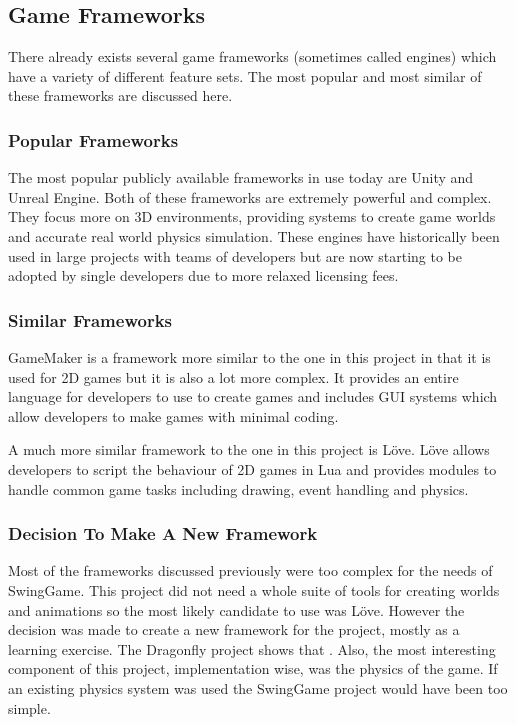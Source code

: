 \documentclass[]{report}
\begin{document}
		\subsection{Game Frameworks}
		There already exists several game frameworks (sometimes called engines) which have a variety of different feature sets. The most popular and most similar of these frameworks are discussed here.
			\subsubsection{Popular Frameworks}
			The most popular publicly available frameworks in use today are Unity\cite{unity} and Unreal Engine\cite{unreal}. Both of these frameworks are extremely powerful and complex. They focus more on 3D environments, providing systems to create game worlds and accurate real world physics simulation. These engines have historically been used in large projects with teams of developers but are now starting to be adopted by single developers due to more relaxed licensing fees.
			\subsubsection{Similar Frameworks}
			GameMaker\cite{gamemaker} is a framework more similar to the one in this project in that it is used for 2D games but it is also a lot more complex. It provides an entire language for developers to use to create games and includes GUI systems which allow developers to make games with minimal coding.
			
			A much more similar framework to the one in this project is Löve\cite{love}. Löve allows developers to script the behaviour of 2D games in Lua and provides modules to handle common game tasks including drawing, event handling and physics.
			\subsubsection{Decision To Make A New Framework}
			Most of the frameworks discussed previously were too complex for the needs of SwingGame. This project did not need a whole suite of tools for creating worlds and animations so the most likely candidate to use was Löve. However the decision was made to create a new framework for the project, mostly as a learning exercise. The Dragonfly project shows that \cite{dragonfly}. Also, the most interesting component of this project, implementation wise, was the physics of the game. If an existing physics system was used the SwingGame project would have been too simple.
			
\end{document}
